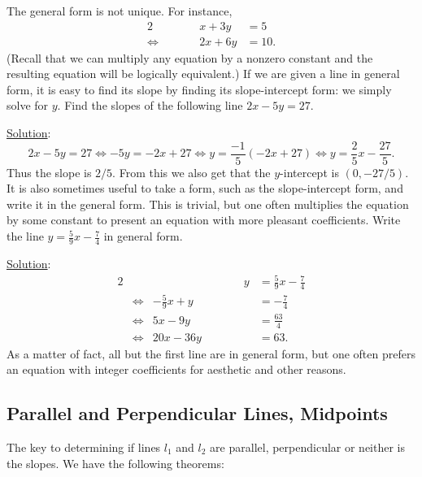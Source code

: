 The general form is not unique.  For instance,
\begin{alignat*}{2}
&&x+3y&=5\\ \iff&\qquad&2x+6y&=10.\end{alignat*}
(Recall that we can multiply any equation by a nonzero constant
and the resulting equation will be logically equivalent.)
If we are given a line in general form, it is easy to 
find its slope by finding its slope-intercept form:  we simply solve for 
$y$.\footnotemark
\bex Find the slopes of the following line  $2x-5y=27$.  

\underline{Solution}:
$$2x-5y=27\iff -5y=-2x+27\iff y=\frac{-1}5(-2x+27)\iff
 y=\frac25x-\frac{27}5.$$
Thus the slope is $2/5$.
From this we also get that the $y$-intercept is $\left(0,-27/5\right)$.
\eex
It is also sometimes useful to take a form, such as the slope-intercept
form, and write it in the general form.  This is trivial, but
one often multiplies the equation by some constant to present
an equation with more pleasant coefficients.
\bex Write the line $y=\frac59x-\frac74$ in general form.

\underline{Solution}:
\begin{alignat*}{2}
&&\qquad\qquad\qquad\qquad y&=\frac59x-\frac74\\
&\iff&-\frac59x+y&=-\frac74\\
&\iff&5x-9y&=\frac{63}4\\
&\iff&20x-36y&=63.\end{alignat*}
As a matter of fact, all but the first line are in general form,
but one often prefers an equation with integer coefficients for
aesthetic and other reasons.
\eex

\subsection{Parallel and Perpendicular Lines, Midpoints}
The key to determining if lines $l_1$ and $l_2$ are 
parallel, perpendicular or neither is the slopes.
We have the following theorems:

